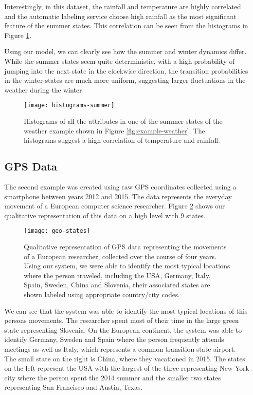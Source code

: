 Interestingly, in this dataset, the rainfall and temperature are highly correlated and the automatic labeling service
choose high rainfall as the most significant feature of the summer states. This correlation can be seen
from the histograms in Figure \ref{fig:histograms-summer}.

Using our model, we can clearly see how the summer and winter dynamics differ. While the summer states seem quite deterministic, with a high probability of jumping into the next state in the clockwise direction, the transition probabilities in the winter states are much more uniform, suggesting larger fluctuations in the weather during the winter.

\begin{figure}[h!]
	\centering
	\texttt{[image: histograms-summer]}
	\caption{Histograms of all the attributes in one of the summer states of the weather example shown in Figure \ref{fig:example-weather}. The histograms suggest a high correlation of temperature and rainfall.}
	\label{fig:histograms-summer}
\end{figure}

\subsection{GPS Data}

The second example was created using raw GPS coordinates collected using a smartphone between years 2012 and 2015.
The data represents the everyday movement of a European computer science researcher. Figure \ref{fig:example-geo}
shows our qualitative representation of this data on a high level with $9$ states.

\begin{figure}[h!]
	\centering
	\texttt{[image: geo-states]}
	\caption{Qualitative representation of GPS data representing the movements of a European researcher, collected over the course of four years. Using our system, we were able to identify the most typical locations where the person traveled, including the USA, Germany, Italy, Spain, Sweden, China and Slovenia, their associated states are shown labeled using appropriate country/city codes.}
	\label{fig:example-geo}
\end{figure}

We can see that the system was able to identify the most typical locations of this persons
movements. The researcher spent most of their time in the large green state representing Slovenia. On the European continent, the system was able to identify Germany, Sweden and Spain where the person frequently attends meetings as well as Italy, which represents a common transition state airport. The small state on the right is China, where they vacationed in 2015. The states on the left represent the USA with the largest of the three representing New York city where the person spent the 2014 summer and the smaller two states representing San Francisco and Austin, Texas.


